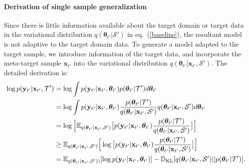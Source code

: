 \documentclass{article} \usepackage[table]{xcolor}
\newcommand{\x}{\mathbf{x}}
\newcommand{\y}{\mathbf{y}}
\newcommand{\dkl}{\mathbb{D}_{\rm{KL}}}
\newcommand{\btheta}{\boldsymbol{\theta}}
\begin{document}
\paragraph{Derivation of single sample generalization} Since there is little information available about the target domain or target data in the variational distribution $q(\btheta_{t'}|\mathcal{S'})$ in eq.~(\ref{baseline}), the resultant model is not adaptive to the target domain data. To generate a model adapted to the target sample, we introduce information of the target data, and incorporate the meta-target sample $\x_{t'}$ into the variational distribution $q(\btheta_{t'}|\x_{t'}, \mathcal{S'})$. The detailed derivation is:
\begin{equation}
\begin{aligned}
    \log p(\y_{t'}|\x_{t'}, \mathcal{T'}) & = \log \int p(\y_{t'}|\x_{t'}, \btheta_{t'})p(\btheta_{t'}|\mathcal{T'})d\btheta_{t'} \\
    & = \log \int p(\y_{t'}|\x_{t'}, \btheta_{t'}) \frac{p(\btheta_{t'}|\mathcal{T'})}{q(\btheta_{t'}|\x_{t'}, \mathcal{S'})} q(\btheta_{t'}|\x_{t'}, \mathcal{S'}) d\btheta_{t'}
    \\
    & = \log \Big[ \mathbb{E}_{q(\btheta_{t'}|\x_{t'}, \mathcal{S'})} \big[ p(\y_{t'}|\x_{t'}, \btheta_{t'}) \frac{p(\btheta_{t'}|\mathcal{T'})}{q(\btheta_{t'}|\x_{t'}, \mathcal{S'})} \big] \Big] \\
    & \geq \mathbb{E}_{q(\btheta_{t'}|\x_{t'}, \mathcal{S'})} \Big[ \log \big[ p(\y_{t'}|\x_{t'}, \btheta_{t'}) \frac{p(\btheta_{t'}|\mathcal{T'})}{q(\btheta_{t'}|\x_{t'}, \mathcal{S'})} \big] \Big] \\
    & = \mathbb{E}_{q(\btheta_{t'}|\x_{t'}, \mathcal{S'}))}[\log p(\y_{t'}|\x_{t'}, \btheta_{t'})] - \dkl [q(\btheta_{t'}|\x_{t'}, \mathcal{S'}) || p(\btheta_{t'}|\mathcal{T'})].
\end{aligned}
\label{supelbo}
\end{equation}
\end{document}

